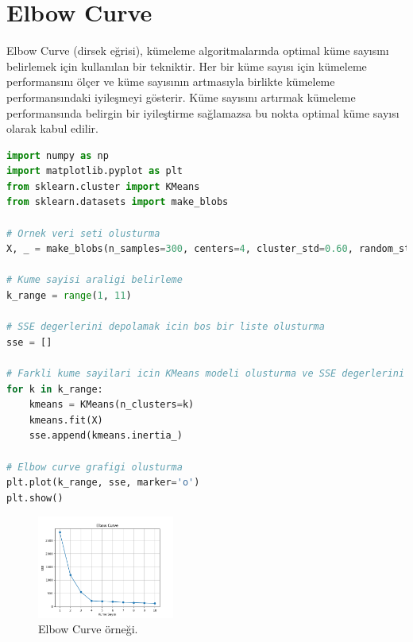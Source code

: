 \section{Elbow Curve}
Elbow Curve (dirsek eğrisi), kümeleme algoritmalarında optimal küme sayısını belirlemek için kullanılan bir tekniktir. Her bir küme sayısı için kümeleme performansını ölçer ve küme sayısının artmasıyla birlikte kümeleme performansındaki iyileşmeyi gösterir. Küme sayısını artırmak kümeleme performansında belirgin bir iyileştirme sağlamazsa bu nokta optimal küme sayısı olarak kabul edilir.

\begin{lstlisting}[language=Python]
import numpy as np
import matplotlib.pyplot as plt
from sklearn.cluster import KMeans
from sklearn.datasets import make_blobs

# Ornek veri seti olusturma
X, _ = make_blobs(n_samples=300, centers=4, cluster_std=0.60, random_state=0)

# Kume sayisi araligi belirleme
k_range = range(1, 11)

# SSE degerlerini depolamak icin bos bir liste olusturma
sse = []

# Farkli kume sayilari icin KMeans modeli olusturma ve SSE degerlerini hesaplama
for k in k_range:
    kmeans = KMeans(n_clusters=k)
    kmeans.fit(X)
    sse.append(kmeans.inertia_)

# Elbow curve grafigi olusturma
plt.plot(k_range, sse, marker='o')
plt.show()
\end{lstlisting}

\begin{figure}[h]
    \centering
    \includegraphics[width=0.4\textwidth]{images/elbow_curve.png}
    \caption{Elbow Curve örneği.}
    \label{fig:enter-label}
\end{figure}

\newpage
